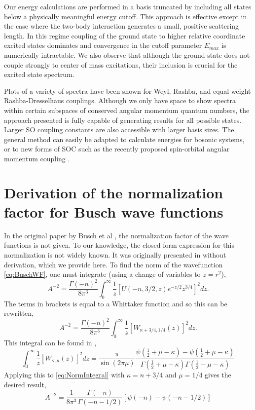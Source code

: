 \documentclass[%
 preprint,
 amsmath,amssymb,
 aps,
]{revtex4-1}
\begin{document}
Our energy calculations are performed in a basis truncated by including all states below a physically meaningful energy cutoff. This approach is effective except in the case where the two-body interaction generates a small, positive scattering length. In this regime coupling of the ground state to higher relative coordinate excited states dominates and convergence in the cutoff parameter $E_{max}$ is numerically intractable. We also observe that although the ground state does not couple strongly to center of mass excitations, their inclusion is crucial for the excited state spectrum. 

Plots of a variety of spectra have been shown for Weyl, Rashba, and equal weight Rashba-Dresselhaus couplings. Although we only have space to show spectra within certain subspaces of conserved angular momentum quantum numbers, the approach presented is fully capable of generating results for all possible states. Larger SO coupling constants are also accessible with larger basis sizes. The general method can easily be adapted to calculate energies for bosonic systems, or to new forms of SOC such as the recently proposed spin-orbital angular momentum coupling \cite{2014arXiv1411.1737S}.




\appendix*
\section{Derivation of the normalization factor for Busch wave functions}
In the original paper by Busch et al \cite{Busch}, the normalization factor of the wave functions is not given. To our knowledge, the closed form expression for this normalization is not widely known. It was originally presented in \cite{PhysRevA.85.053614} without derivation, which we provide here. To find the norm of the wavefunction \eqref{eq:BuschWF}, one must integrate (using a change of variables to $z=r^2$),
\begin{equation}\label{eq:NormIntegral}
A^{-2}=\frac{\Gamma(-n)^2}{8\pi^3}  \int_0^\infty \frac{1}{z}\left[U(-n,3/2,z)e^{-z/2} z^{3/4} \right]^2  dz.
\end{equation}
The terms in brackets is equal to a Whittaker function \cite{DLMF} and so this can be rewritten,
\begin{equation}
A^{-2}=\frac{\Gamma(-n)^2}{8\pi^3}  \int_0^\infty \frac{1}{z}\left[W_{n+3/4,1/4}(z) \right]^2  dz.
\end{equation}
This integral can be found in \cite{GradshteynRyzhik},
\begin{equation}
\int_0^\infty \frac{1}{z}\left[W_{\kappa,\mu}(z) \right]^2  dz=\frac{\pi}{\sin (2\pi \mu)}\frac{\psi(\frac{1}{2}+\mu-\kappa)-\psi(\frac{1}{2}+\mu-\kappa)}{\Gamma(\frac{1}{2}+\mu-\kappa)\Gamma(\frac{1}{2}-\mu-\kappa)}
\end{equation}
Applying this to \eqref{eq:NormIntegral} with $\kappa=n+3/4$ and $\mu=1/4$ gives the desired result,
\begin{equation}
A^{-2}=\frac{1}{8\pi^3}  \frac{\Gamma (-n)}{\Gamma(-n-1/2)}\left[\psi(-n)-\psi(-n-1/2)\right]
\end{equation}
\end{document}
